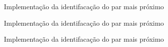 

\begin{frame}[fragile]{Implementação da identifacação do par mais próximo}
\end{frame}

\begin{frame}[fragile]{Implementação da identifacação do par mais próximo}
\end{frame}

\begin{frame}[fragile]{Implementação da identifacação do par mais próximo}
\end{frame}
